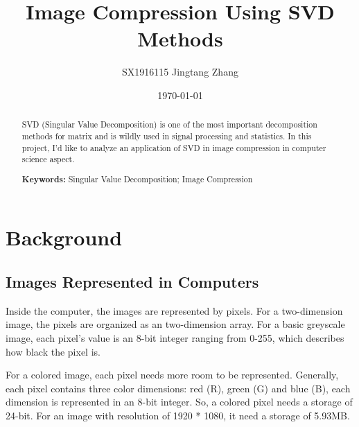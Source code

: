 \documentclass{article}
\begin{document}
    \title{Image Compression Using SVD Methods}
    \author{SX1916115 Jingtang Zhang}
    \date{\today}

    \maketitle

    \newpage

    \begin{abstract}
        SVD (Singular Value Decomposition)
        is one of the most important decomposition methods for matrix
        and is wildly used in signal processing and statistics.
        In this project, I’d like to analyze an application of
        SVD in image compression in computer science aspect.
        \par\textbf{Keywords: } Singular Value Decomposition; Image Compression
    \end{abstract}

    \section{Background}

        \subsection{Images Represented in Computers}
            \par
            Inside the computer, the images are represented by pixels.
            For a two-dimension image,
            the pixels are organized as an two-dimension array.
            For a basic greyscale image,
            each pixel’s value is an 8-bit integer ranging from 0-255,
            which describes how black the pixel is.
            \par
            For a colored image, each pixel needs more room to be represented.
            Generally, each pixel contains three color dimensions: 
            red (R), green (G) and blue (B),
            each dimension is represented in an 8-bit integer. 
            So, a colored pixel needs a storage of 24-bit.
            For an image with resolution of 1920 * 1080,
            it need a storage of 5.93MB.
\end{document}
